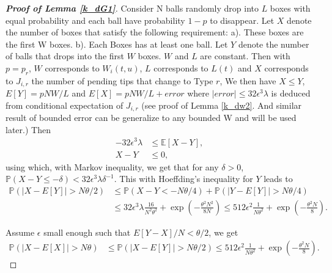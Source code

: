 \documentclass[12pt]{article}
\def\E{\mathbb{E}}
\def\P{\mathbb{P}}
\numberwithin{equation}{section}  %
\begin{document}


\begin{proof}[\textbf{Proof of Lemma \ref{k_dG1}}]
Consider N balls randomly drop into $L$ boxes with equal probability and each ball have probability $1-p$ to disappear. Let $X$ denote the number of boxes that satisfy the following requirement: a). These boxes are the first W boxes. b). Each Boxes has at least one ball. Let $Y$ denote the number of balls that drops into the first $W$ boxes. $W$ and $L$ are constant. Then with $p=p_r$, $W$ corresponds to $W_i(t,u)$, $L$ corresponds to $L(t)$ and $X$ corresponds to $J_{i,r}$ the number of pending tips that change to Type $r$,  
We then have $X\leq Y$, $E[Y]=pNW/L$ and $E[X]=pNW/L+error$ where $|error|\leq 32\epsilon^3\lambda$ is deduced from conditional expectation of $J_{i,r}$ (see proof of Lemma \ref{k_dw2}. And similar result of bounded error can be generalize to any bounded W and will be used later.) Then
\begin{align}
-32\epsilon^3\lambda&\leq \E[X-Y]\label{kpf_dj_eq1},\\
X-Y&\leq 0\label{kpf_dj_eq2},
\end{align} 
using which, with Markov inequality, we get that for any $\delta>0$, $\P(X-Y\leq -\delta)< 32\epsilon^3\lambda\delta^{-1}$. This with Hoeffding's inequality for $Y$ leads to
\begin{align*} 
\P(|X-E[Y]|>N\theta/2)&\leq \P(X-Y< -N\theta/4)+\P(|Y-E[Y]|>N\theta/4)\\
&\leq 32\epsilon^3\lambda\frac{16}{N^2\theta^2}+\exp\left(
-\frac{\theta^2N^2}{8N}\right)\leq 512\epsilon^2\frac{1}{N\theta^2}+\exp\left(
-\frac{\theta^2N}{8}\right).
\end{align*}  

Assume $\epsilon$ small enough such that  $E[Y-X]/N< \theta/2$, we get
\begin{align} 
\P(|X-E[X]|>N\theta)&\leq \P(|X-E[Y]|>N\theta/2)\leq 512\epsilon^2\frac{1}{N\theta^2}+\exp\left(
-\frac{\theta^2N}{8}\right).\label{eq_ballinbox}
\end{align} 


\end{proof}
\end{document}
